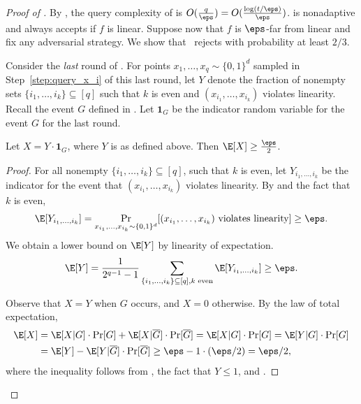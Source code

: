 \documentclass{toc}
\begin{document}
\begin{proof}[Proof of ]
By , the query complexity of  is $O(\frac q \eps)=O(\frac{\log (t/\eps)}\eps)$.  is nonadaptive and always accepts if $f$ is linear. Suppose now that $f$ is $\eps$-far from linear and fix any adversarial strategy. We show that~ rejects with probability at least $2/3$. 

 Consider the \emph{last} round of . For points $x_1, \dots, x_q \sim \{0,1\}^d$ sampled in Step~\ref{step:query_x_i} of this last round, let $Y$ denote the fraction of nonempty sets $\{i_1, \dots, i_{k}\} \subseteq [q]$ such that $k$ is even and $(x_{i_1}, \dots, x_{i_{k}})$ violates linearity. Recall the event $G$ defined in . Let  $\mathbf{1}_{G}$ be the indicator random variable for the event $G$ for the last round. 
 

\begin{claim}\label{clm:x}
Let $X = Y \cdot \mathbf{1}_{G}$, where $Y$ is as defined above. Then $\E[X] \geq \frac{\eps}{2}$. 
\end{claim}
\begin{proof}
For all nonempty $\{i_1, \dots, i_k \} \subseteq [q]$, such that $k$ is even, let $Y_{i_1,\dots, i_{k}}$ be the indicator
for the event that $(x_{i_1}, \dots, x_{i_{k}})$ violates linearity. By  and the fact that $k$ is even, 
\[\E[Y_{i_1,\dots, i_{k}}] = \Pr_{x_{i_1},\dots,  x_{i_{k}} \sim \{0,1\}^d}[ (x_{i_1}, \dots, x_{i_{k}})\textnormal{ violates linearity}] \geq \eps.\] 
We obtain a lower bound on $\E[Y]$ by linearity of expectation.
\begin{equation}\label{eq:y}
    \E[Y]= \frac{1}{2^{q-1} - 1}\sum_{\{i_1, \dots, i_k\} \subseteq [q],k \textnormal{ even}} \E[Y_{i_1,\dots, i_{k}}] \geq \eps.
\end{equation}
%

Observe that $X=Y$ when $G$ occurs, and $X=0$ otherwise. By the law of total expectation,
\begin{align*}
 \E[X] &=\E[X|G]\cdot\Pr[G]+ \E[X|\overline{G}]\cdot\Pr[\overline{G}] 
 = \E[X|G]\cdot\Pr[G]=\E[Y|G]\cdot\Pr[G] \\
&=\E[Y]- \E[Y|\overline{G}]\cdot\Pr[\overline{G}]\geq \eps - 1\cdot (\eps/2) = \eps/2,
\end{align*}
where the inequality follows from  , the fact that $Y\leq 1$, and . 
\end{proof}



\end{proof}
\end{document}
